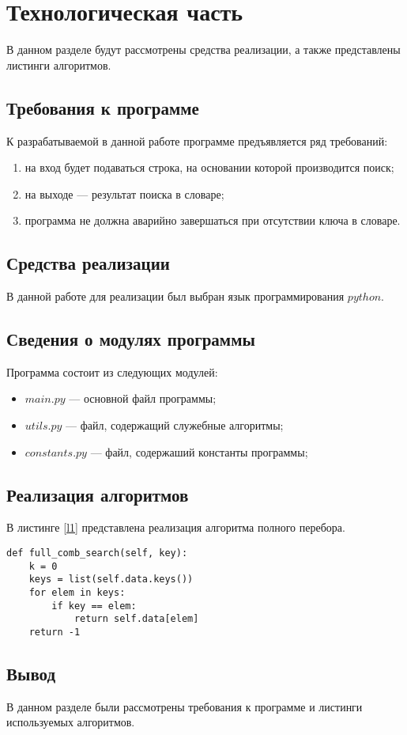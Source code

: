 \chapter{Технологическая часть}
В данном разделе будут рассмотрены средства реализации, а также представлены листинги алгоритмов.
\section{Требования к программе}

К разрабатываемой в данной работе программе предъявляется ряд требований:
\begin{enumerate}[label=\arabic*), itemindent=1em]
	\item на вход будет подаваться строка, на основании которой производится поиск;
	\item на выходе --- результат поиска в словаре;
	\item программа не должна аварийно завершаться при отсутствии ключа в словаре.
\end{enumerate}

\section{Средства реализации}
В данной работе для реализации был выбран язык программирования $python$. 
\section{Сведения о модулях программы}
Программа состоит из следующих модулей:
\begin{itemize}[itemindent=1.25em]
	\item $main.py$ --- основной файл программы;
	\item $utils.py$ --- файл, содержащий служебные алгоритмы;
	\item $constants.py$ --- файл, содержаший константы программы;
\end{itemize}

\section{Реализация алгоритмов}
В листинге \ref{l1} представлена реализация алгоритма полного перебора. 
\begin{center}
\begin{lstlisting}[label=l1, caption={Реализация алгоритма полного перебора}]
def full_comb_search(self, key):
	k = 0
	keys = list(self.data.keys())
	for elem in keys:
		if key == elem:
			return self.data[elem]
	return -1
\end{lstlisting}
\end{center}

\section*{\hsp Вывод}

В данном разделе были рассмотрены требования к программе и листинги используемых алгоритмов.